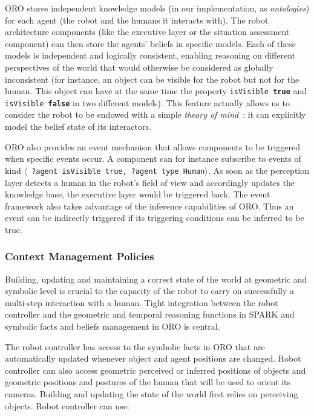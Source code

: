 \documentclass[preprint,12pt]{elsarticle}
\newcommand{\concept}[1]{{\small \texttt{#1}}}
\newcommand{\stmt}[1]{{\footnotesize \tt $\langle$ #1\relax$\rangle$}}
\begin{document}
ORO stores independent knowledge models (in our implementation, as
\emph{ontologies}) for each agent (the robot and the humans it
interacts with). The robot architecture components (like the executive
layer or the situation assessment component) can then store the
agents' beliefs in specific models.  Each of these models is
independent and logically consistent, enabling reasoning on different
perspectives of the world that would otherwise be considered as
globally inconsistent (for instance, an object can be visible for the
robot but not for the human. This object can have at the same time the
property \concept{isVisible \textbf{true}} and \concept{isVisible
  \textbf{false}} in two different models). This feature actually
allows us to consider the robot to be endowed with a simple
\emph{theory of mind}~\cite{Scassellati2002}: it can explicitly
model the belief state of its interactors.

ORO also provides an event mechanism that allows components to be
triggered when specific events occur. A component can
for instance subscribe to events of kind \stmt{?agent isVisible
  true, ?agent type Human}. As soon as the perception layer detects a
human in the robot's field of view and accordingly updates the
knowledge base, the executive layer would be triggered back. The
event framework also takes advantage of the inference capabilities of
ORO. Thus an event can be indirectly triggered if its triggering
conditions can be inferred to be true.

\subsubsection{Context Management Policies} 

Building, updating and maintaining a correct state of the world at
geometric and symbolic level is crucial to the capacity of the robot
to carry on successfully a multi-step interaction with a human. Tight
integration between the robot controller and the geometric and
temporal reasoning functions in SPARK and symbolic facts and beliefs
management in ORO is central.
 
The robot controller has access to the symbolic facts in ORO that are
automatically updated whenever object and agent positions are changed.
Robot controller can also access geometric perceived or inferred
positions of objects and geometric positions and postures of the human
that will be used to orient its cameras.  Building and updating the
state of the world first relies on perceiving objects. Robot
controller can use:
\end{document}
